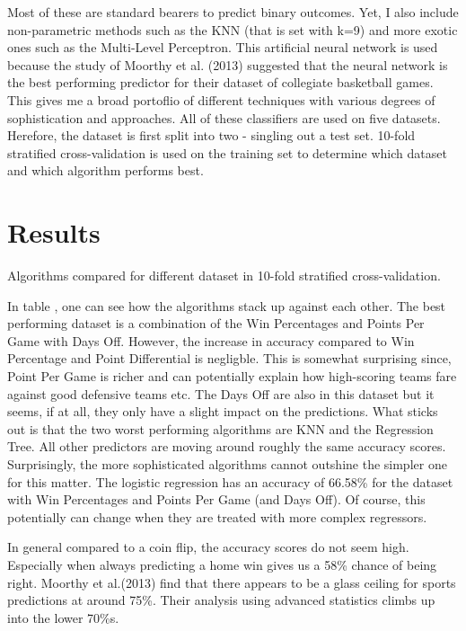 \documentclass[11pt,a4paper,leqno]{article}
\begin{document}
Most of these are standard bearers to predict binary outcomes. Yet, I also include non-parametric methods such as the KNN (that is set with k=9) and more exotic ones such as the Multi-Level Perceptron. This artificial neural network is used because the study of Moorthy et al. (2013) suggested that the neural network is the best performing predictor for their dataset of collegiate basketball games. This gives me a broad portoflio of different techniques with various degrees of sophistication and approaches. All of these classifiers are used on five datasets. Herefore, the dataset is first split into two - singling out a test set. 10-fold stratified cross-validation is used on the training set to determine which dataset and which algorithm performs best.

\section{Results}

\begin{table}

\caption{Algorithms compared for different dataset in 10-fold stratified cross-validation.}
\label{table 1}
    

 \end{table}

In table , one can see how the algorithms stack up against each other. The best performing dataset is a combination of the Win Percentages and Points Per Game with Days Off. However, the increase in accuracy compared to Win Percentage and Point Differential is negligble. This is somewhat surprising since, Point Per Game is richer and can potentially explain how high-scoring teams fare against good defensive teams etc. The Days Off are also in this dataset but it seems, if at all, they only have a slight impact on the predictions. What sticks out is that the two worst performing algorithms are KNN and the Regression Tree. All other predictors are moving around roughly the same accuracy scores. Surprisingly, the more sophisticated algorithms cannot outshine the simpler one for this matter. The logistic regression has an accuracy of 66.58\% for the dataset with Win Percentages and Points Per Game (and Days Off). Of course, this potentially can change when they are treated with more complex regressors.

In general compared to a coin flip, the accuracy scores do not seem high. Especially when always predicting a home win gives us a 58\% chance of being right. Moorthy et al.(2013) find that there appears to be a glass ceiling for sports predictions at around 75\%. Their analysis using advanced statistics climbs up into the lower 70\%s.
\end{document}
